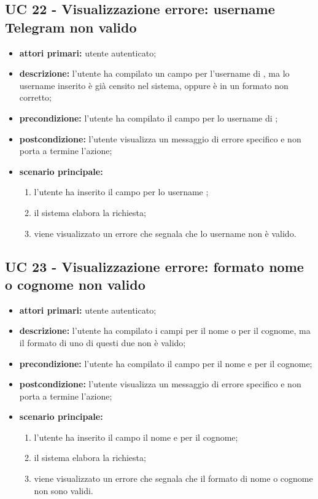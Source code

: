 
		\subsection{UC 22 - Visualizzazione errore: username Telegram non valido}
		\begin{itemize}
			\item \textbf{attori primari:} utente autenticato;
			\item \textbf{descrizione:} l'utente ha compilato un campo per l'username di , ma lo username inserito è già censito nel sistema, oppure è in un formato non corretto;
			\item \textbf{precondizione:} l'utente ha compilato il campo per lo username di ;
			\item \textbf{postcondizione:} l'utente visualizza un messaggio di errore specifico e non porta a termine l'azione;
			\item \textbf{scenario principale:}
			\begin{enumerate}
				\item l'utente ha inserito il campo per lo username ;
				\item il sistema elabora la richiesta;
				\item viene visualizzato un errore che segnala che lo username  non è valido.
			\end{enumerate}
		\end{itemize}



		\subsection{UC 23 - Visualizzazione errore: formato nome o cognome non valido}
		\begin{itemize}
			\item \textbf{attori primari:} utente autenticato;
			\item \textbf{descrizione:} l'utente ha compilato i campi per il nome o per il cognome, ma il formato di uno di questi due non è valido;
			\item \textbf{precondizione:} l'utente ha compilato il campo per il nome e per il cognome;
			\item \textbf{postcondizione:} l'utente visualizza un messaggio di errore specifico e non porta a termine l'azione;
			\item \textbf{scenario principale:}
			\begin{enumerate}
				\item l'utente ha inserito il campo il nome e per il cognome;
				\item il sistema elabora la richiesta;
				\item viene visualizzato un errore che segnala che il formato di nome o cognome non sono validi.
			\end{enumerate}
		\end{itemize}
